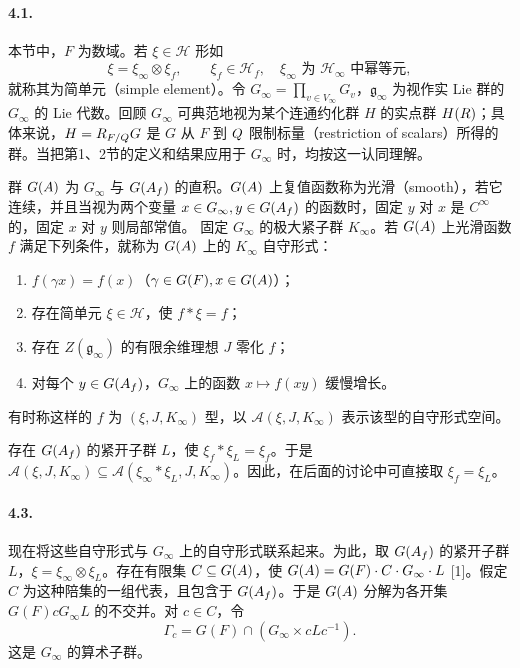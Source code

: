 \paragraph*{4.1.}
本节中，$F$ 为数域。若 $\xi\in\mathcal H$ 形如
\[
\xi=\xi_\infty\otimes\xi_f,\qquad\xi_f\in\mathcal H_f,\quad\xi_\infty\text{ 为 }\mathcal H_\infty\text{ 中幂等元},\tag{1}
\]
就称其为简单元（simple element）。令 $G_\infty=\prod_{v\in V_\infty}G_v$，$\mathfrak g_\infty$ 为视作实 Lie 群的 $G_\infty$ 的 Lie 代数。回顾 $G_\infty$ 可典范地视为某个连通约化群 $H$ 的实点群 $H(R)$；具体来说，$H=R_{F/Q}G$ 是 $G$ 从 $F$ 到 $Q$ 限制标量（restriction of scalars）所得的群。当把第1、2节的定义和结果应用于 $G_\infty$ 时，均按这一认同理解。

群 $G(A)$ 为 $G_\infty$ 与 $G(A_f)$ 的直积。$G(A)$ 上复值函数称为光滑（smooth），若它连续，并且当视为两个变量 $x\in G_\infty,y\in G(A_f)$ 的函数时，固定 $y$ 对 $x$ 是 $C^\infty$ 的，固定 $x$ 对 $y$ 则局部常值。
固定 $G_\infty$ 的极大紧子群 $K_\infty$。若 $G(A)$ 上光滑函数 $f$ 满足下列条件，就称为 $G(A)$ 上的 $K_\infty$ 自守形式：
\begin{enumerate}
\item[(a)] $f(\gamma x)=f(x)$（$\gamma\in G(F),x\in G(A)$）；
\item[(b)] 存在简单元 $\xi\in\mathcal H$，使 $f*\xi=f$；
\item[(c)] 存在 $Z(\mathfrak g_\infty)$ 的有限余维理想 $J$ 零化 $f$；
\item[(d)] 对每个 $y\in G(A_f)$，$G_\infty$ 上的函数 $x\mapsto f(xy)$ 缓慢增长。
\end{enumerate}
有时称这样的 $f$ 为 $(\xi,J,K_\infty)$ 型，以 $\mathcal A(\xi,J,K_\infty)$ 表示该型的自守形式空间。

存在 $G(A_f)$ 的紧开子群 $L$，使 $\xi_f*\xi_L=\xi_f$。于是 $\mathcal A(\xi,J,K_\infty)\subseteq\mathcal A(\xi_\infty*\xi_L,J,K_\infty)$。因此，在后面的讨论中可直接取 $\xi_f=\xi_L$。
\paragraph*{4.3.}
现在将这些自守形式与 $G_\infty$ 上的自守形式联系起来。为此，取 $G(A_f)$ 的紧开子群 $L$，$\xi=\xi_\infty\otimes\xi_L$。存在有限集 $C\subseteq G(A)$，使 $G(A)=G(F)\cdot C\cdot G_\infty\cdot L$ [1]。假定 $C$ 为这种陪集的一组代表，且包含于 $G(A_f)$。于是 $G(A)$ 分解为各开集 $G(F)cG_\infty L$ 的不交并。对 $c\in C$，令
\[
\Gamma_c=G(F)\cap(G_\infty\times cLc^{-1}).\tag{1}
\]
这是 $G_\infty$ 的算术子群。

